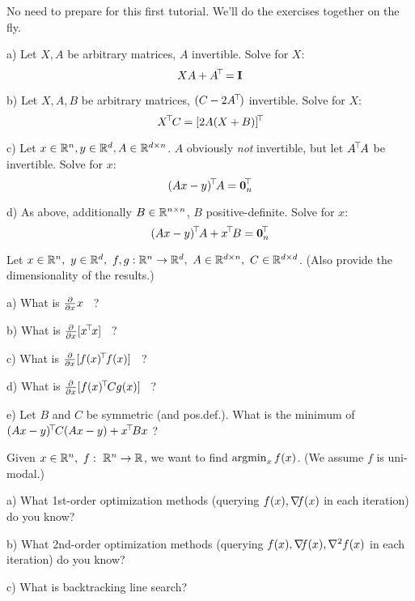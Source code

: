 

\renewcommand{\course}{Robotics}
\renewcommand{\coursepicture}{roboticsLecture}
\renewcommand{\coursedate}{Winter 2014}
\renewcommand{\exnum}{1}

\exercises


\exercisestitle


No need to prepare for this first tutorial. We'll do the exercises together on the fly.



a) Let $X,A$ be arbitrary matrices, $A$ invertible. Solve for $X$:
$$ X A + A^{\!\top\!} = {\rm\bf I} $$


b) Let $X,A,B$ be arbitrary matrices, $(C-2A^{\!\top\!})$ invertible. Solve for $X$:
$$ X^{\!\top\!} C = [2 A (X + B)]^{\!\top\!} $$


c) Let $x\in{\mathbb{R}}^n,y\in{\mathbb{R}}^d,A\in{\mathbb{R}}^{d\times n}$. $A$ obviously \emph{not}
invertible, but let $A^{\!\top\!} A$ be invertible. Solve for $x$:
$$ (A x - y)^{\!\top\!} A = \boldsymbol 0_n^{\!\top\!} $$


d) As above, additionally $B\in{\mathbb{R}}^{n\times n}$, $B$
positive-definite. Solve for $x$: 
$$ (A x - y)^{\!\top\!} A + x^{\!\top\!} B = \boldsymbol 0_n^{\!\top\!} $$



Let $x\in{\mathbb{R}}^n,~ y\in{\mathbb{R}}^d,~ f,g: {\mathbb{R}}^n \to {\mathbb{R}}^d,~
A\in{\mathbb{R}}^{d\times n},~ C \in {\mathbb{R}}^{d \times d}$. (Also provide the dimensionality of the results.)

a) What is $\frac{\partial}{\partial x} x$ ~?


b) What is $\frac{\partial}{\partial x}[x^{\!\top\!} x]$ ~?


c) What is $\frac{\partial}{\partial x}[f(x)^{\!\top\!} f(x)]$ ~?


d) What is $\frac{\partial}{\partial x}[f(x)^{\!\top\!} C g(x)]$ ~?


e) Let $B$ and $C$ be symmetric (and pos.def.). What is the minimum of $(Ax -
y)^{\!\top\!} C (Ax - y) + x^{\!\top\!} B x$ ?



Given $x\in{\mathbb{R}}^n,~ f:~ {\mathbb{R}}^n \to {\mathbb{R}}$, we want to find $\operatorname*{argmin}_x f(x)$.  (We assume $f$ is uni-modal.)

a) What 1st-order optimization methods (querying $f(x),{\nabla_{\!\!}} f(x)$ in each iteration) do you know?


b) What 2nd-order optimization methods (querying $f(x),{\nabla_{\!\!}} f(x), {\nabla_{\!\!}^2}
f(x)$ in each iteration) do you know?


c) What is backtracking line search?


\exerfoot
